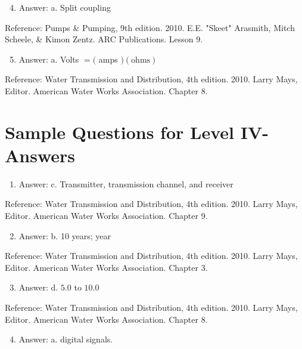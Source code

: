 \documentclass[10pt]{article}
\begin{document}
\begin{enumerate}
  \setcounter{enumi}{3}
  \item Answer: a. Split coupling
\end{enumerate}

Reference: Pumps \& Pumping, 9th edition. 2010. E.E. "Skeet" Arasmith, Mitch Scheele, \& Kimon Zentz. ARC Publications. Lesson 9.

\begin{enumerate}
  \setcounter{enumi}{4}
  \item Answer: a. Volts $=($ amps $)(\mathrm{ohms})$
\end{enumerate}

Reference: Water Transmission and Distribution, 4th edition. 2010. Larry Mays, Editor. American Water Works Association. Chapter 8.

\section{Sample Questions for Level IV-Answers}
\begin{enumerate}
  \item Answer: c. Transmitter, transmission channel, and receiver
\end{enumerate}

Reference: Water Transmission and Distribution, 4th edition. 2010. Larry Mays, Editor. American Water Works Association. Chapter 9.

\begin{enumerate}
  \setcounter{enumi}{1}
  \item Answer: b. 10 years; year
\end{enumerate}

Reference: Water Transmission and Distribution, 4th edition. 2010. Larry Mays, Editor. American Water Works Association. Chapter 3.

\begin{enumerate}
  \setcounter{enumi}{2}
  \item Answer: d. $5.0$ to $10.0$
\end{enumerate}

Reference: Water Transmission and Distribution, 4th edition. 2010. Larry Mays, Editor. American Water Works Association. Chapter 8.

\begin{enumerate}
  \setcounter{enumi}{3}
  \item Answer: a. digital signals.
\end{enumerate}
\end{document}
